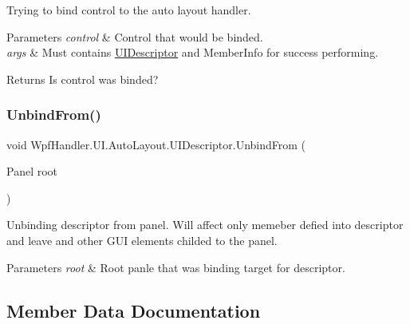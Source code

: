 Trying to bind control to the auto layout handler. 


\begin{DoxyParams}{Parameters}
{\em control} & Control that would be binded.\\
\hline
{\em args} & Must contains \mbox{\hyperlink{class_wpf_handler_1_1_u_i_1_1_auto_layout_1_1_u_i_descriptor}{U\+I\+Descriptor}} and Member\+Info for success performing.\\
\hline
\end{DoxyParams}
\begin{DoxyReturn}{Returns}
Is control was binded?
\end{DoxyReturn}
\mbox{\label{class_wpf_handler_1_1_u_i_1_1_auto_layout_1_1_u_i_descriptor_aa2a2328a6283c4df8aad0b8f925922e8}} 
\subsubsection{\texorpdfstring{Unbind\+From()}{UnbindFrom()}}
{\footnotesize\ttfamily void Wpf\+Handler.\+U\+I.\+Auto\+Layout.\+U\+I\+Descriptor.\+Unbind\+From (\begin{DoxyParamCaption}\item[{Panel}]{root }\end{DoxyParamCaption})}



Unbinding descriptor from panel. Will affect only memeber defied into descriptor and leave and other G\+UI elements childed to the panel. 


\begin{DoxyParams}{Parameters}
{\em root} & Root panle that was binding target for descriptor.\\
\hline
\end{DoxyParams}


\subsection{Member Data Documentation}
\mbox{\label{class_wpf_handler_1_1_u_i_1_1_auto_layout_1_1_u_i_descriptor_a5870ffc200ecb9f352cb250b497b3df2}} 
